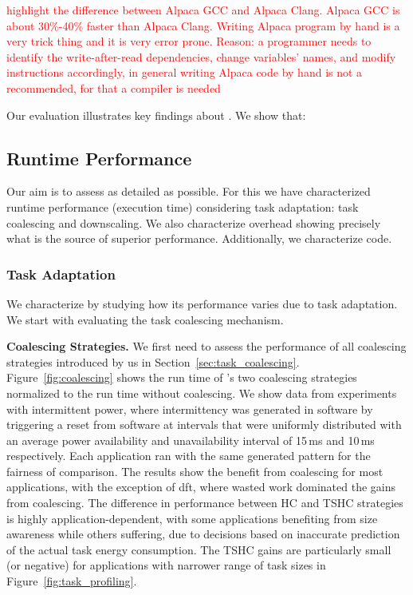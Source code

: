 \textcolor{red}{highlight the difference between Alpaca GCC and Alpaca Clang. Alpaca GCC is about 30\%-40\% faster than Alpaca Clang. Writing Alpaca program by hand is a very trick thing and it is very error prone. Reason: a programmer needs to identify the write-after-read dependencies, change variables' names, and modify instructions accordingly, in general writing Alpaca code by hand is not a recommended, for that a compiler is needed}

Our evaluation illustrates key findings about \sys. We show that: 


\subsection{\sys Runtime Performance}
\label{sec:results_evaluation}

Our aim is to assess \sys as detailed as possible. For this we have characterized \sys runtime performance (execution time) considering task adaptation: task coalescing and downscaling. We also characterize \sys overhead showing precisely what is the source of \sys superior performance. Additionally, we characterize \sys code.

\subsubsection{\sys Task Adaptation}
\label{sec:result_coalescing}

We characterize \sys by studying how its performance varies due to task adaptation. We start with evaluating the task coalescing mechanism.

\textbf{Coalescing Strategies.} We first need to assess the performance of all coalescing strategies introduced by us in Section~\ref{sec:task_coalescing}. Figure~\ref{fig:coalescing} shows the run time of \sys's two coalescing strategies normalized to the run time without coalescing. We show data from experiments with intermittent power, where intermittency was generated in software
by triggering a reset from software at intervals that were uniformly distributed with an average power availability and unavailability interval of 15\,ms and 10\,ms respectively. Each application ran with the same generated pattern for the fairness of comparison. The results show the benefit from coalescing for most applications, with the
exception of dft, where wasted work dominated the gains from coalescing.
The difference in performance between HC and TSHC strategies is highly
application-dependent, with some applications benefiting from size awareness
while others suffering, due to decisions based on inaccurate prediction of the
actual task energy consumption. The TSHC gains are particularly small (or negative) for applications with narrower range of task sizes in Figure~\ref{fig:task_profiling}.

